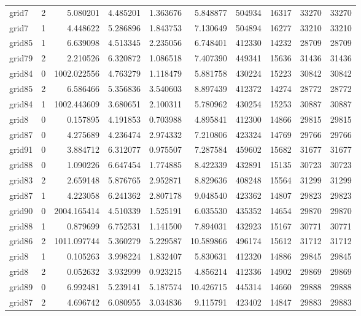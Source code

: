 \begin{longtable}{|l|r|r|r|r|r|r|r|r|r|}
grid7 & 2 & 5.080201 & 4.485201 & 1.363676 & 5.848877 & 504934 & 16317 & 33270 & 33270 \\
grid7 & 1 & 4.448622 & 5.286896 & 1.843753 & 7.130649 & 504894 & 16277 & 33210 & 33210 \\
grid85 & 1 & 6.639098 & 4.513345 & 2.235056 & 6.748401 & 412330 & 14232 & 28709 & 28709 \\
grid79 & 2 & 2.210526 & 6.320872 & 1.086518 & 7.407390 & 449341 & 15636 & 31436 & 31436 \\
grid84 & 0 & 1002.022556 & 4.763279 & 1.118479 & 5.881758 & 430224 & 15223 & 30842 & 30842 \\
grid85 & 2 & 6.586466 & 5.356836 & 3.540603 & 8.897439 & 412372 & 14274 & 28772 & 28772 \\
grid84 & 1 & 1002.443609 & 3.680651 & 2.100311 & 5.780962 & 430254 & 15253 & 30887 & 30887 \\
grid8 & 0 & 0.157895 & 4.191853 & 0.703988 & 4.895841 & 412300 & 14866 & 29815 & 29815 \\
grid87 & 0 & 4.275689 & 4.236474 & 2.974332 & 7.210806 & 423324 & 14769 & 29766 & 29766 \\
grid91 & 0 & 3.884712 & 6.312077 & 0.975507 & 7.287584 & 459602 & 15682 & 31677 & 31677 \\
grid88 & 0 & 1.090226 & 6.647454 & 1.774885 & 8.422339 & 432891 & 15135 & 30723 & 30723 \\
grid83 & 2 & 2.659148 & 5.876765 & 2.952871 & 8.829636 & 408248 & 15564 & 31299 & 31299 \\
grid87 & 1 & 4.223058 & 6.241362 & 2.807178 & 9.048540 & 423362 & 14807 & 29823 & 29823 \\
grid90 & 0 & 2004.165414 & 4.510339 & 1.525191 & 6.035530 & 435352 & 14654 & 29870 & 29870 \\
grid88 & 1 & 0.879699 & 6.752531 & 1.141500 & 7.894031 & 432923 & 15167 & 30771 & 30771 \\
grid86 & 2 & 1011.097744 & 5.360279 & 5.229587 & 10.589866 & 496174 & 15612 & 31712 & 31712 \\
grid8 & 1 & 0.105263 & 3.998224 & 1.832407 & 5.830631 & 412320 & 14886 & 29845 & 29845 \\
grid8 & 2 & 0.052632 & 3.932999 & 0.923215 & 4.856214 & 412336 & 14902 & 29869 & 29869 \\
grid89 & 0 & 6.992481 & 5.239141 & 5.187574 & 10.426715 & 445314 & 14660 & 29888 & 29888 \\
grid87 & 2 & 4.696742 & 6.080955 & 3.034836 & 9.115791 & 423402 & 14847 & 29883 & 29883 \\

\end{longtable}
